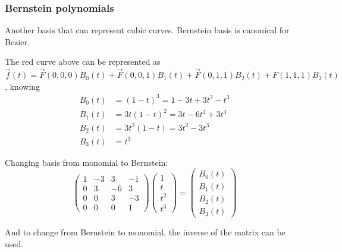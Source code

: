 \documentclass[12pt]{article}
\begin{document}
\subsubsection{Bernstein polynomials}

Another basis that can represent cubic curves. Bernstein basis is
canonical for Bezier.


The red curve above can be represented as $\vec f(t) = \vec F(0,0,0)
B_0(t) + \vec F(0,0,1)B_1(t) + \vec F(0,1,1)B_2(t) + F(1,1,1)B_3(t)$, 
knowing
\begin{align*}
    B_0(t) &= (1-t)^3 = 1-3t+3t^2-t^3\\
    B_1(t) &= 3t(1-t)^2 = 3t-6t^2+3t^3\\
    B_2(t) &= 3t^2(1-t) = 3t^2-3t^3\\
    B_3(t) &= t^3
\end{align*}

Changing basis from monomial to Bernstein:
\[
    \begin{pmatrix}
        1 & -3 & 3 & -1\\
        0 & 3 & -6 & 3\\
        0 & 0 & 3 & -3\\
        0 & 0 & 0 & 1
    \end{pmatrix}
    \begin{pmatrix}
        1\\
        t\\
        t^2\\
        t^3
    \end{pmatrix}
    =
    \begin{pmatrix}
        B_0(t)\\
        B_1(t)\\
        B_2(t)\\
        B_3(t)
    \end{pmatrix}
\]

And to change from Bernstein to monomial, the inverse of the matrix
can be used.
\end{document}
